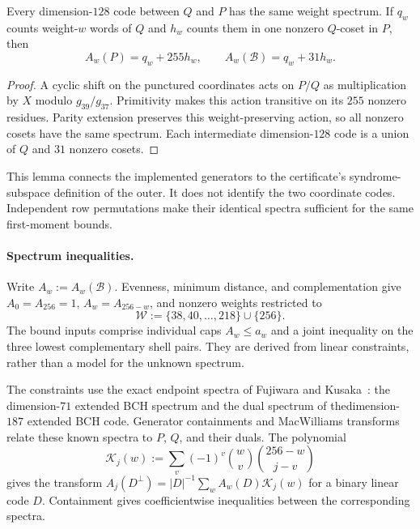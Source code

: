 \begin{lemma}
\leavevmode\par
Every dimension-$128$ code between $Q$ and $P$ has the same weight spectrum.
If $q_w$ counts weight-$w$ words of $Q$ and $h_w$ counts them in one nonzero
$Q$-coset in $P$, then
\begin{equation}
 A_w(P)=q_w+255h_w,\qquad A_w(\mathcal B)=q_w+31h_w.
 \label{eq:finite-quotient-spectrum}
\end{equation}
\end{lemma}
\begin{proof}
A cyclic shift on the punctured coordinates acts on $P/Q$ as multiplication
by $X$ modulo $g_{39}/g_{37}$. Primitivity makes this action transitive on
its $255$ nonzero residues. Parity extension preserves this weight-preserving
action, so all nonzero cosets have the same spectrum. Each intermediate
dimension-$128$ code is a union of $Q$ and $31$ nonzero cosets.
\end{proof}

This lemma connects the implemented generators to the certificate's\linebreak
syndrome-subspace definition of the outer. It does not identify the two
coordinate codes. Independent row permutations make their identical
spectra sufficient for the same first-moment bounds.

\paragraph{Spectrum inequalities.}
Write $A_w:=A_w(\mathcal B)$. Evenness, minimum distance, and complementation
give $A_0=A_{256}=1$, $A_w=A_{256-w}$, and nonzero weights restricted to
\[
 \mathcal W:=\{38,40,\ldots,218\}\cup\{256\}.
\]
The bound inputs comprise individual caps $A_w\le a_w$ and a joint
inequality on the three lowest complementary shell pairs. They are derived
from linear constraints, rather than a model for the unknown spectrum.

The constraints use the exact endpoint spectra of Fujiwara and
Kusaka~\cite{FujiwaraKusaka2021}: the dimension-$71$ extended BCH spectrum
and the dual spectrum of the\linebreak dimension-$187$ extended BCH code.
Generator containments and MacWilliams transforms relate these known
spectra to $P$, $Q$, and their duals. The polynomial
\[
 \mathcal K_j(w):=\sum_v(-1)^v\binom wv\binom{256-w}{j-v}
\]
gives the transform
$A_j(D^\perp)=|D|^{-1}\sum_w A_w(D)\mathcal K_j(w)$ for a binary linear
code $D$. Containment gives coefficientwise inequalities between the
corresponding spectra.


